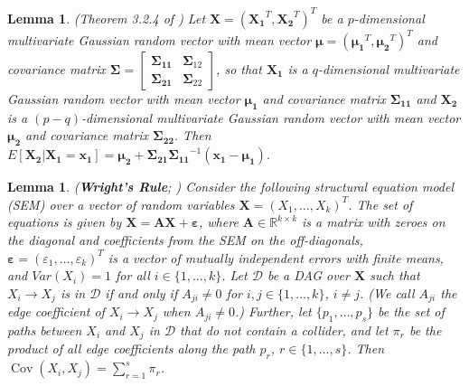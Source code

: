 \documentclass[11pt]{article}
\DeclareMathOperator{\Cov}{Cov}
\newtheorem{lemma}[theorem]{Lemma}
\newcommand{\mb}[1]{\mathbf{#1}}
\newcommand{\g}[1][G]{\mathcal{#1}}
\begin{document}
\begin{lemma}
\label{lem:mardia}
{\normalfont (Theorem 3.2.4 of \citealp{mardia1980multivariate})}
    Let $\mb{X} = (\mb{X_1}^T, \mb{X_2}^T)^T$ be a $p$-dimensional multivariate Gaussian random vector with mean vector $\mb{\mu} = (\mb{\mu_1}^T, \mb{\mu_2}^T)^T$ and covariance matrix $\mb{\Sigma} = \begin{bmatrix}
    \mb{\Sigma_{11}} & \mb{\Sigma}_{12} \\
    \mb{\Sigma_{21}} & \mb{\Sigma}_{22}
    \end{bmatrix}$, so that $\mb{X_1}$ is a $q$-dimensional multivariate Gaussian random vector with mean vector $\mb{\mu_1}$ and covariance matrix $\mb{\Sigma_{11}}$ and $\mb{X_2}$ is a $(p-q)$-dimensional multivariate Gaussian random vector with mean vector $\mb{\mu_2}$ and covariance matrix $\mb{\Sigma_{22}}$. Then $E[\mb{X_2}|\mb{X_1} = \mb{x_1}] = \mb{\mu_2} + \mb{\Sigma_{21}} \mb{\Sigma_{11}}^{-1}(\mb{x_1} - \mb{\mu_1})$.
\end{lemma}


\begin{lemma}
\label{lem:wright}
{\normalfont (\textbf{Wright's Rule}; \citealp{wright1921correlation, wright1934method})}
    Consider the following structural equation model (SEM) over a vector of random variables $\mb{X} = (X_1, \dots, X_k)^T$. The set of equations is given by $\mb{X}=\mb{AX}+\mb{\varepsilon}$, where $\mb{A} \in \mathbb{R}^{k \times k}$ is a matrix with zeroes on the diagonal and coefficients from the SEM on the off-diagonals, $\mb{\varepsilon} = (\varepsilon_1, \dots, \varepsilon_k)^T$ is a vector of mutually independent errors with finite means, and $Var(X_i) = 1$ for all $i \in \{1, \dots, k\}$. Let $\g[D]$ be a DAG over $\mb{X}$ such that $X_i \to X_j$ is in $\g[D]$ if and only if $A_{ji} \neq 0$ for $i, j \in \{1, \dots, k\}$, $i \neq j$. (We call $A_{ji}$ the edge coefficient of $X_i \to X_j$ when $A_{ji} \neq 0$.) Further, let $\{p_1, \dots, p_s\}$ be the set of paths between $X_i$ and $X_j$ in $\g[D]$ that do not contain a collider, and let $\pi_r$ be the product of all edge coefficients along the path $p_r$, $r \in \{1, \dots, s\}$. Then $\Cov(X_i, X_j) = \sum_{r=1}^s \pi_r$.
\end{lemma}
\end{document}
